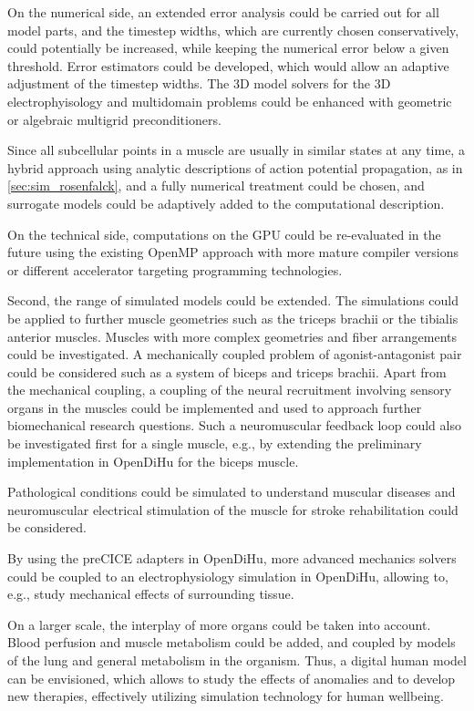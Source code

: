 On the numerical side, an extended error analysis could be carried out for all model parts, and the timestep widths, which are currently chosen conservatively, could potentially be increased, while keeping the numerical error below a given threshold. Error estimators could be developed, which would allow an adaptive adjustment of the timestep widths.
The 3D model solvers for the 3D electrophyisology and multidomain problems could be enhanced with geometric or algebraic multigrid preconditioners.

Since all subcellular points in a muscle are usually in similar states at any time, a hybrid approach using analytic descriptions of action potential propagation, as in \cref{sec:sim_rosenfalck}, and a fully numerical treatment could be chosen, and surrogate models could be adaptively added to the computational description.

On the technical side, computations on the GPU could be re-evaluated in the future using the existing OpenMP approach with more mature compiler versions or different accelerator targeting programming technologies.

Second, the range of simulated models could be extended. The simulations could be applied to further muscle geometries such as the triceps brachii or the tibialis anterior muscles. Muscles with more complex geometries and fiber arrangements could be investigated. 
A mechanically coupled problem of agonist-antagonist pair could be considered such as a system of biceps and triceps brachii. Apart from the mechanical coupling, a coupling of the neural recruitment involving sensory organs in the muscles could be implemented and used to approach further biomechanical research questions. Such a neuromuscular feedback loop could also be investigated first for a single muscle, e.g., by extending the preliminary implementation in OpenDiHu for the biceps muscle.

Pathological conditions could be simulated to understand muscular diseases and neuromuscular electrical stimulation of the muscle for stroke rehabilitation could be considered.

By using the preCICE adapters in OpenDiHu, more advanced mechanics solvers could be coupled to an electrophysiology simulation in OpenDiHu, allowing to, e.g., study mechanical effects of surrounding tissue.

On a larger scale, the interplay of more organs could be taken into account. Blood perfusion and muscle metabolism could be added, and coupled by models of the lung and general metabolism in the organism. Thus, a digital human model can be envisioned, which allows to study the effects of anomalies and to develop new therapies, effectively utilizing simulation technology for human wellbeing.


